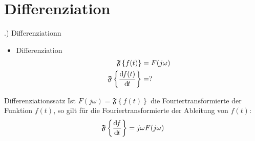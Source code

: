 \documentclass[t,14pt]{beamer}
\newcommand*\diff{\mathop{}\!\mathrm{d\hspace{-1pt}}}	%
\begin{document}
\section{Differenziation}
\begin{frame}{\thesection .) Differenziationn}
    \begin{itemize}
        \item Differenziation
        \begin{align*}
           \mathfrak{F}\left\{f(t) \right\} &= F(j\omega)\\
           \mathfrak{F}\left\{\frac{\diff f(t)}{\diff t} \right\} &= ?
        \end{align*} 
        \begin{center}
        \end{center}      
    \end{itemize}
    \begin{alertblock}{Differenziationssatz}
       Ist $F(j\omega)=\mathfrak{F}\left\{f(t)\right\}$ die Fouriertransformierte der Funktion $f(t)$, so gilt für die Fouriertransformierte der Ableitung von $f(t)$:
       \[
        \mathfrak{F}\left\{ \frac{\diff f}{\diff t} \right\} = j\omega F(j\omega)
       \]
    \end{alertblock}
\end{frame}
\end{document}
